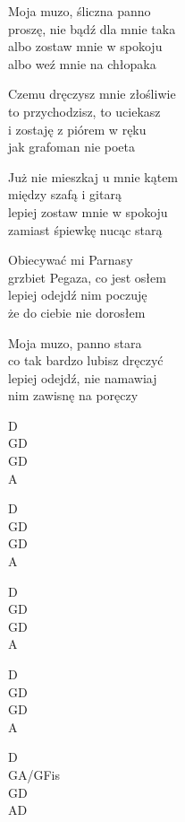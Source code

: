 \begin{text}
    Moja muzo, śliczna panno\\
    proszę, nie bądź dla mnie taka\\
    albo zostaw mnie w spokoju\\
    albo weź mnie na chłopaka

    Czemu dręczysz mnie złośliwie\\
    to przychodzisz, to uciekasz\\
    i zostaję z piórem w ręku\\
    jak grafoman nie poeta

    Już nie mieszkaj u mnie kątem\\
    między szafą i gitarą\\
    lepiej zostaw mnie w spokoju\\
    zamiast śpiewkę nucąc starą

    Obiecywać mi Parnasy\\
    grzbiet Pegaza, co jest osłem\\
    lepiej odejdź nim poczuję\\
    że do ciebie nie dorosłem

    Moja muzo, panno stara\\
    co tak bardzo lubisz dręczyć\\
    lepiej odejdź, nie namawiaj\\
    nim zawisnę na poręczy
\end{text}
\begin{chord}
    D\\
    GD\\
    GD\\
    A

    D\\
    GD\\
    GD\\
    A

    D\\
    GD\\
    GD\\
    A

    D\\
    GD\\
    GD\\
    A

    D\\
    GA/GFis\\
    GD\\
    AD
\end{chord}